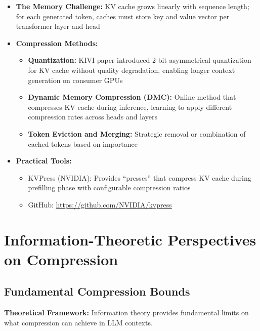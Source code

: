 \documentclass[11pt]{article}
\begin{document}
\begin{itemize}[leftmargin=*]
    \item \textbf{The Memory Challenge:} KV cache grows linearly with sequence length; for each generated token, caches must store key and value vector per transformer layer and head
    \item \textbf{Compression Methods:}
    \begin{itemize}
        \item \textbf{Quantization:} KIVI paper introduced 2-bit asymmetrical quantization for KV cache without quality degradation, enabling longer context generation on consumer GPUs
        \item \textbf{Dynamic Memory Compression (DMC):} Online method that compresses KV cache during inference, learning to apply different compression rates across heads and layers
        \item \textbf{Token Eviction and Merging:} Strategic removal or combination of cached tokens based on importance
    \end{itemize}
    \item \textbf{Practical Tools:}
    \begin{itemize}
        \item KVPress (NVIDIA): Provides ``presses'' that compress KV cache during prefilling phase with configurable compression ratios
        \item GitHub: \url{https://github.com/NVIDIA/kvpress}
    \end{itemize}
\end{itemize}

\section{Information-Theoretic Perspectives on Compression}

\subsection{Fundamental Compression Bounds}

\textbf{Theoretical Framework:} Information theory provides fundamental limits on what compression can achieve in LLM contexts.
\end{document}
